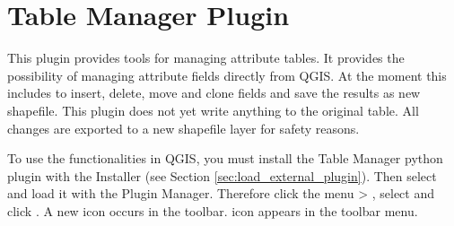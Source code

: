 
\section{Table Manager Plugin}\label{sec:ftools}

\updatedisclaimer

This plugin provides tools for managing attribute tables. It provides the 
possibility of managing attribute fields directly from QGIS. At the moment 
this includes to insert, delete, move and clone fields and save the results 
as new shapefile. This plugin does not yet write anything to the original 
table. All changes are exported to a new shapefile layer for safety reasons.


To use the functionalities in QGIS, you must install the Table Manager python 
plugin with the  Installer (see Section 
\ref{sec:load_external_plugin}). Then select and load it with the Plugin Manager. 
Therefore click the menu  > 
, select  and click 
. A new  icon occurs 
in the toolbar. icon appears in the toolbar menu.





